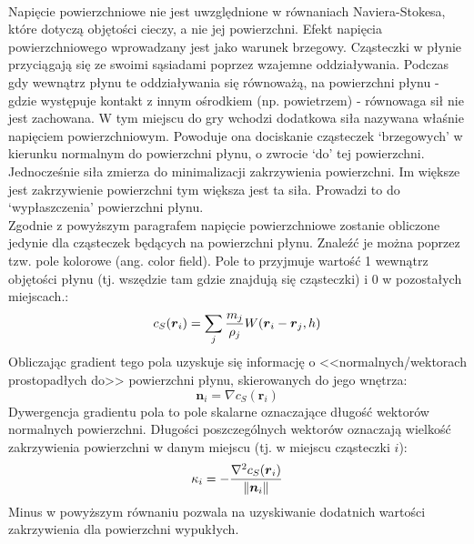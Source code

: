 \paragraph{}
Napięcie powierzchniowe nie jest uwzględnione w równaniach Naviera-Stokesa, które dotyczą objętości cieczy, a nie jej powierzchni. Efekt napięcia powierzchniowego wprowadzany jest jako warunek brzegowy. Cząsteczki w płynie przyciągają się ze swoimi sąsiadami poprzez wzajemne oddziaływania. Podczas gdy wewnątrz płynu te oddziaływania się równoważą, na powierzchni płynu - gdzie występuje kontakt z innym ośrodkiem (np. powietrzem) - równowaga sił nie jest zachowana. W tym miejscu do gry wchodzi dodatkowa siła nazywana właśnie napięciem powierzchniowym. Powoduje ona dociskanie cząsteczek `brzegowych' w kierunku normalnym do powierzchni płynu, o zwrocie `do' tej powierzchni. Jednocześnie siła zmierza do minimalizacji zakrzywienia powierzchni. Im większe jest zakrzywienie powierzchni tym większa jest ta siła. Prowadzi to do `wypłaszczenia' powierzchni płynu.\\
Zgodnie z powyższym paragrafem napięcie powierzchniowe zostanie obliczone jedynie dla cząsteczek będących na powierzchni płynu. Znaleźć je można poprzez tzw. pole kolorowe (ang. color field). Pole to przyjmuje wartość 1 wewnątrz objętości płynu (tj. wszędzie tam gdzie znajdują się cząsteczki) i 0 w pozostałych miejscach.:
\begin{equation}
{c}_S(\boldsymbol{r}_i) = \sum\limits_{j} {m_j \over \rho_j} W(\boldsymbol{r}_i-\boldsymbol{r}_j, h)
\label{eqn:color_field}
\end{equation}
Obliczając gradient tego pola uzyskuje się informację o <<normalnych/wektorach prostopadłych do>> powierzchni płynu, skierowanych do jego wnętrza:
\begin{equation}
\boldsymbol{n}_i = \nabla{c}_S(\boldsymbol{r}_i)
\label{eqn:color_field_grad}
\end{equation}
Dywergencja gradientu pola to pole skalarne oznaczające długość wektorów normalnych powierzchni. Długości poszczególnych wektorów oznaczają wielkość zakrzywienia powierzchni w danym miejscu (tj. w miejscu cząsteczki $i$):
\begin{equation}
\kappa_i = -{\nabla^2{c}_S(\boldsymbol{r}_i) \over \|\boldsymbol{n}_i\|}
\label{eqn:color_field_div}
\end{equation}
Minus w powyższym równaniu pozwala na uzyskiwanie dodatnich wartości zakrzywienia dla powierzchni wypukłych.\\
